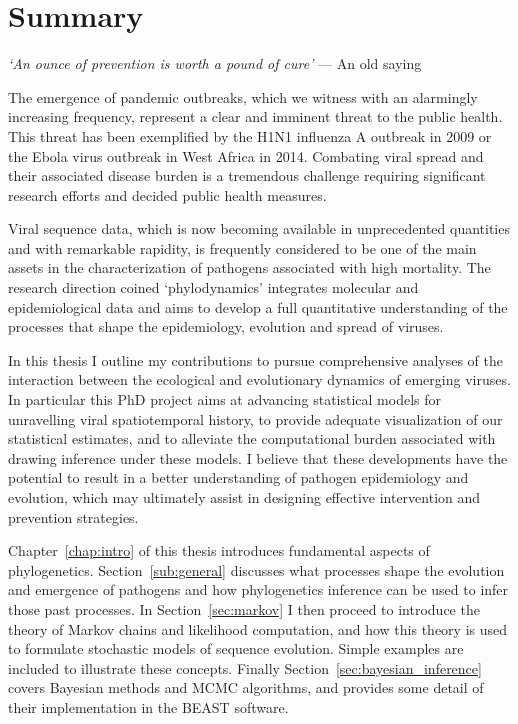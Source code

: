 
\chapter*{Summary}

\bigskip{}

\emph{`An ounce of prevention is worth a pound of cure'}
--- An old saying

\bigskip{}

The emergence of pandemic outbreaks, which we witness with an alarmingly increasing frequency, represent a clear and imminent threat to the public health. 
This threat has been exemplified by the H1N1 influenza A outbreak in 2009 or the Ebola virus outbreak in West Africa in 2014.
Combating viral spread and their associated disease burden is a tremendous challenge requiring significant research efforts and decided public health measures. 

Viral sequence data, which is now becoming available in unprecedented quantities and with remarkable rapidity, is frequently considered to be one of the main assets in the characterization of pathogens associated with high mortality. 
The research direction coined `phylodynamics' integrates molecular and epidemiological data and aims to develop a full quantitative understanding  of the processes that shape the epidemiology, evolution and spread of viruses.

In this thesis I outline my contributions to pursue comprehensive analyses of the interaction between the ecological and evolutionary dynamics of emerging viruses.
In particular this PhD project aims at advancing statistical models for unravelling viral spatiotemporal history, to provide adequate visualization of our statistical estimates, and to alleviate the computational burden associated with drawing inference under these models.
I believe that these developments have the potential to result in a better understanding of pathogen epidemiology and evolution, which may ultimately assist in designing effective intervention and prevention strategies. 

Chapter~\ref{chap:intro} of this thesis introduces fundamental aspects of phylogenetics.
Section~\ref{sub:general} discusses what processes shape the evolution and emergence of pathogens and how phylogenetics inference can be used to infer those past processes.
In Section~\ref{sec:markov} I then proceed to introduce the theory of Markov chains and likelihood computation, and how this theory is used to formulate stochastic models of sequence evolution. 
Simple examples are included to illustrate these concepts.
Finally Section~\ref{sec:bayesian_inference} covers Bayesian methods and MCMC algorithms, and provides some detail of their implementation in the BEAST software.


